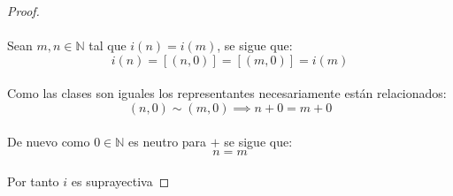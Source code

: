 \documentclass[11pt,letterpaper]{article}
\newcommand{\N}{\mathbb{N}}
\newcommand{\Z}{\mathbb{Z}}
\begin{document}
    \begin{proof}\,\\
        \,\\
        Sean $m,n\in \N$ tal que $i(n)=i(m)$, se sigue que:\,\\
        \begin{equation*}
            i(n)=[(n,0)]=[(m,0)]=i(m)
        \end{equation*}\,\\
        Como las clases son iguales los representantes necesariamente est\'an relacionados:\,\\
        \begin{equation*}
            (n,0)\sim(m,0)\implies n+0=m+0
        \end{equation*}\,\\
        De nuevo como $0\in \N$ es neutro para $+$ se sigue que:\,\\
        \begin{equation*}
            n=m
        \end{equation*}\,\\
        Por tanto $i$ es suprayectiva
    \end{proof}\,\\
\,\\
\end{document}
